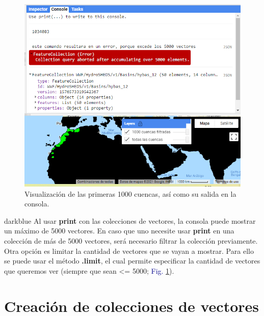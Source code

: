 \documentclass[
  12pt,
  letterpaper,
  twoside]{book}
\newcommand\boldpurple[1]{\textcolor{darkpurple}{\textbf{#1}}}
\begin{document}
\begin{figure}[H]

{\centering \includegraphics[width=0.95\linewidth]{Img/ej14} 

}

\caption{Visualización de las primeras 1000 cuencas, así como su salida en la consola.}\label{fig:f82}
\end{figure}

\begin{bluebox2}

\begin{awesomeblock}{5pt}{\faLightbulb}{darkblue}
Al usar \boldpurple{print} con las colecciones de vectores, la consola puede mostrar un máximo de 5000 vectores. En caso que uno necesite usar \boldpurple{print} en una colección de más de 5000 vectores, será necesario filtrar la colección previamente. Otra opción es limitar la cantidad de vectores que se vayan a mostrar. Para ello se puede usar el método \boldpurple{.limit}, el cual permite especificar la cantidad de vectores que queremos ver (siempre que sean \textless= 5000; \textcolor{darkblue}{Fig.} \ref{fig:f82}).

\end{awesomeblock}

\end{bluebox2}

\hypertarget{creaciuxf3n-de-colecciones-de-vectores}{%
\section{Creación de colecciones de vectores}\label{creaciuxf3n-de-colecciones-de-vectores}}
\end{document}
